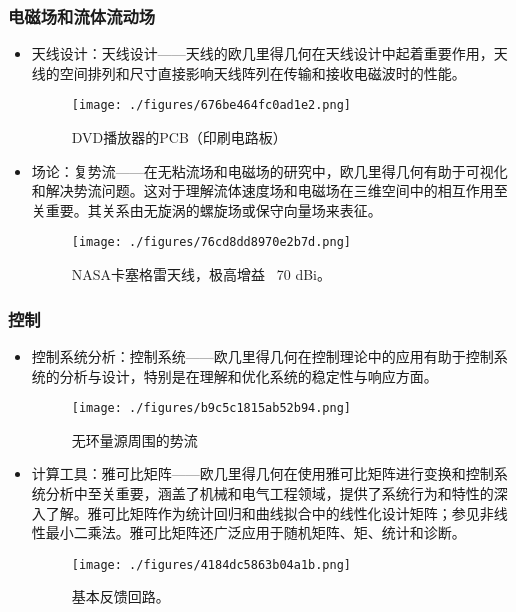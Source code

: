\subsubsection{电磁场和流体流动场 } 
\begin{itemize}
\item 天线设计：天线设计——天线的欧几里得几何在天线设计中起着重要作用，天线的空间排列和尺寸直接影响天线阵列在传输和接收电磁波时的性能。
\begin{figure}[ht]
\centering
\texttt{[image: ./figures/676be464fc0ad1e2.png]}
\caption{DVD播放器的PCB（印刷电路板）} \label{fig_OJLJH_16}
\end{figure}
\item 场论：复势流——在无粘流场和电磁场的研究中，欧几里得几何有助于可视化和解决势流问题。这对于理解流体速度场和电磁场在三维空间中的相互作用至关重要。其关系由无旋涡的螺旋场或保守向量场来表征。
\begin{figure}[ht]
\centering
\texttt{[image: ./figures/76cd8dd8970e2b7d.png]}
\caption{NASA卡塞格雷天线，极高增益 ~70 dBi。} \label{fig_OJLJH_17}
\end{figure}
\end{itemize}
\subsubsection{控制}
\begin{itemize}
\item 控制系统分析：控制系统——欧几里得几何在控制理论中的应用有助于控制系统的分析与设计，特别是在理解和优化系统的稳定性与响应方面。
\begin{figure}[ht]
\centering
\texttt{[image: ./figures/b9c5c1815ab52b94.png]}
\caption{无环量源周围的势流} \label{fig_OJLJH_18}
\end{figure}
\item 计算工具：雅可比矩阵——欧几里得几何在使用雅可比矩阵进行变换和控制系统分析中至关重要，涵盖了机械和电气工程领域，提供了系统行为和特性的深入了解。雅可比矩阵作为统计回归和曲线拟合中的线性化设计矩阵；参见非线性最小二乘法。雅可比矩阵还广泛应用于随机矩阵、矩、统计和诊断。
\begin{figure}[ht]
\centering
\texttt{[image: ./figures/4184dc5863b04a1b.png]}
\caption{基本反馈回路。} \label{fig_OJLJH_19}
\end{figure}
\end{itemize}
